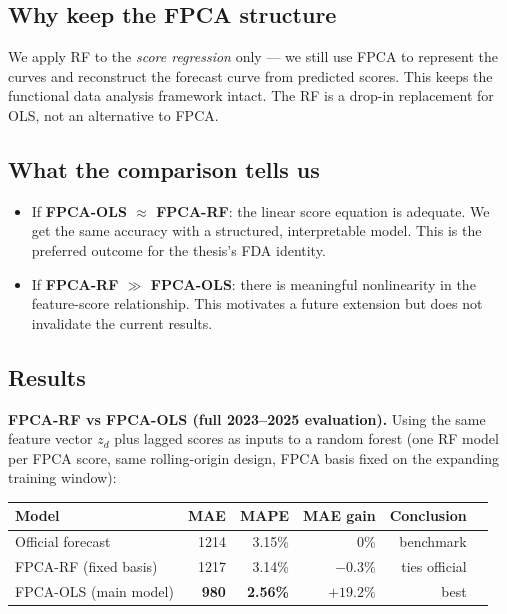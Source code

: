 \documentclass[11pt,a4paper]{article}
\begin{document}
\subsection{Why keep the FPCA structure}

We apply RF to the \emph{score regression} only --- we still use FPCA
to represent the curves and reconstruct the forecast curve from
predicted scores. This keeps the functional data analysis framework
intact. The RF is a drop-in replacement for OLS, not an alternative to FPCA.

\subsection{What the comparison tells us}

\begin{itemize}[nosep]
  \item If \textbf{FPCA-OLS $\approx$ FPCA-RF}: the linear score equation
    is adequate. We get the same accuracy with a structured, interpretable
    model. This is the preferred outcome for the thesis's FDA identity.
  \item If \textbf{FPCA-RF $\gg$ FPCA-OLS}: there is meaningful nonlinearity
    in the feature-score relationship. This motivates a future extension but
    does not invalidate the current results.
\end{itemize}

\subsection{Results}

\textbf{FPCA-RF vs FPCA-OLS (full 2023--2025 evaluation).}
Using the same feature vector $z_d$ plus lagged scores as inputs to a
random forest (one RF model per FPCA score, same rolling-origin design,
FPCA basis fixed on the expanding training window):

\begin{center}
\begin{tabular}{lrrrrr}
\toprule
Model & MAE & MAPE & MAE gain & Conclusion \\
\midrule
Official forecast & 1214 & 3.15\% & 0\% & benchmark \\
FPCA-RF (fixed basis) & 1217 & 3.14\% & $-0.3\%$ & ties official \\
FPCA-OLS (main model) & \textbf{980} & \textbf{2.56\%} & $+19.2\%$ & best \\
\bottomrule
\end{tabular}
\end{center}
\end{document}
